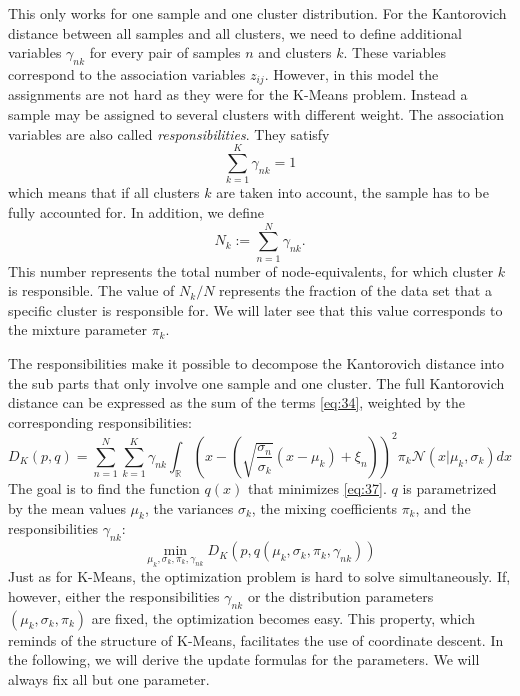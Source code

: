 
This only works for one sample and one cluster distribution.
For the Kantorovich distance between all samples and all clusters, we need to define additional variables $\gamma_{nk}$ for every pair of samples $n$ and clusters $k$.
These variables correspond to the association variables $z_{ij}$.
However, in this model the assignments are not hard as they were for the K-Means problem.
Instead a sample may be assigned to several clusters with different weight.
The association variables are also called \textit{responsibilities}.
They satisfy
\begin{equation}
  \label{eq:35}
  \sum_{k=1}^K\gamma_{nk} = 1
\end{equation}
which means that if all clusters $k$ are taken into account, the sample has to be fully accounted for.
In addition, we define
\begin{equation}
  \label{eq:36}
  N_k := \sum_{n=1}^N \gamma_{nk}.
\end{equation}
This number represents the total number of node-equivalents, for which cluster $k$ is responsible.
The value of $N_k/N$ represents the fraction of the data set that a specific cluster is responsible for.
We will later see that this value corresponds to the mixture parameter $\pi_k$.

The responsibilities make it possible to decompose the Kantorovich distance into the sub parts that only involve one sample and one cluster.
The full Kantorovich distance can be expressed as the sum of the terms \eqref{eq:34}, weighted by the corresponding responsibilities:
\begin{equation}
  \label{eq:37}
  D_K(p,q) = \sum_{n=1}^N\sum_{k=1}^K\gamma_{nk}\int_\mathbb{R}\left(x-\left(\sqrt{\frac{\sigma_n}{\sigma_k}}(x-\mu_k)+\xi_n\right)\right)^2\pi_k\mathcal{N}(x|\mu_k,\sigma_k)dx
\end{equation}
The goal is to find the function $q(x)$ that minimizes \eqref{eq:37}.
$q$ is parametrized by the mean values $\mu_k$, the variances $\sigma_k$, the mixing coefficients $\pi_k$, and the responsibilities $\gamma_{nk}$:
\begin{equation}
  \label{eq:38}
  \min\limits_{\mu_k,\sigma_k,\pi_k, \gamma_{nk}}D_K(p,q(\mu_k,\sigma_k,\pi_k, \gamma_{nk}))
\end{equation}
Just as for K-Means, the optimization problem is hard to solve simultaneously.
If, however, either the responsibilities $\gamma_{nk}$ or the distribution parameters $(\mu_k, \sigma_k, \pi_k)$ are fixed, the optimization becomes easy.
This property, which reminds of the structure of K-Means, facilitates the use of coordinate descent.
In the following, we will derive the update formulas for the parameters.
We will always fix all but one parameter.

